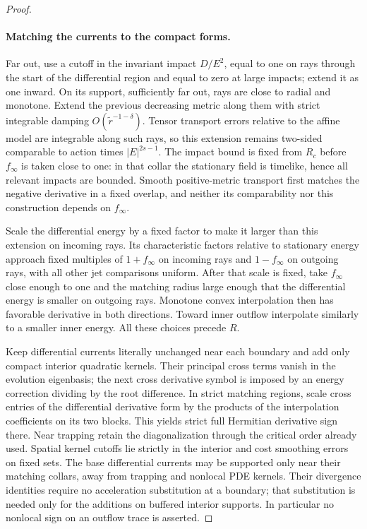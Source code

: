 \begin{proof}
\paragraph{Matching the currents to the compact forms.}
Far out, use a cutoff in the invariant impact $D/E^2$, equal to one on rays
through the start of the differential region and equal to zero at large
impacts; extend it as one inward.  On its support, sufficiently far out, rays
are close to radial and monotone.  Extend the previous decreasing metric along
them with strict integrable damping $O(\widetilde r^{-1-\delta})$.  Tensor
transport errors relative to the affine model are integrable along such
rays, so this extension remains two-sided comparable to action times
$|E|^{2s-1}$.  The impact bound is fixed from $R_c$ before $f_\infty$ is
taken close to one: in that collar the stationary field is timelike, hence
all relevant impacts are bounded.  Smooth positive-metric transport first
matches the negative derivative in a fixed overlap, and neither its
comparability nor this construction depends on $f_\infty$.

Scale the differential energy by a fixed factor to make it larger than this
extension on incoming rays.  Its characteristic factors relative to stationary
energy approach fixed multiples of $1+f_\infty$ on incoming rays and
$1-f_\infty$ on outgoing rays, with all other jet comparisons uniform.
After that scale is fixed, take $f_\infty$ close enough to one and the
matching radius large enough that the differential energy is smaller on
outgoing rays.  Monotone convex interpolation then has favorable derivative
in both directions.  Toward inner outflow interpolate similarly to a smaller
inner energy.  All these choices precede $R$.

Keep differential currents literally unchanged near each boundary and add
only compact interior quadratic kernels.  Their principal cross terms vanish
in the evolution eigenbasis; the next cross derivative symbol is imposed by
an energy correction dividing by the root difference.  In strict matching
regions, scale cross entries of the differential derivative form by the
products of the interpolation coefficients on its two blocks.  This yields
strict full Hermitian derivative sign there.  Near trapping retain the
diagonalization through the critical order already used.  Spatial kernel
cutoffs lie strictly in the interior and cost smoothing errors on fixed
sets.  The base differential currents may be supported only near their
matching collars, away from trapping and nonlocal PDE kernels.  Their
divergence identities require no acceleration substitution at a boundary;
that substitution is needed only for the additions on buffered interior
supports.  In particular no nonlocal sign on an outflow trace is asserted.


\end{proof}
